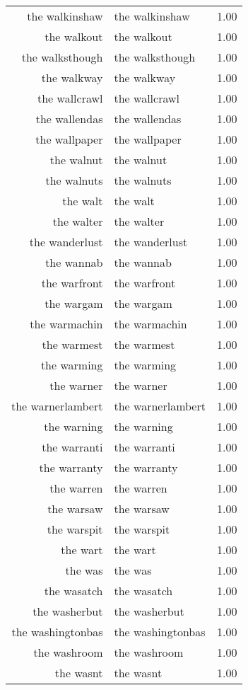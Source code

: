 \begin{table}[ht]
\begin{tabular}{rlr}
  the walkinshaw & the walkinshaw & 1.00 \\ 
  the walkout & the walkout & 1.00 \\ 
  the walksthough & the walksthough & 1.00 \\ 
  the walkway & the walkway & 1.00 \\ 
  the wallcrawl & the wallcrawl & 1.00 \\ 
  the wallendas & the wallendas & 1.00 \\ 
  the wallpaper & the wallpaper & 1.00 \\ 
  the walnut & the walnut & 1.00 \\ 
  the walnuts & the walnuts & 1.00 \\ 
  the walt & the walt & 1.00 \\ 
  the walter & the walter & 1.00 \\ 
  the wanderlust & the wanderlust & 1.00 \\ 
  the wannab & the wannab & 1.00 \\ 
  the warfront & the warfront & 1.00 \\ 
  the wargam & the wargam & 1.00 \\ 
  the warmachin & the warmachin & 1.00 \\ 
  the warmest & the warmest & 1.00 \\ 
  the warming & the warming & 1.00 \\ 
  the warner & the warner & 1.00 \\ 
  the warnerlambert & the warnerlambert & 1.00 \\ 
  the warning & the warning & 1.00 \\ 
  the warranti & the warranti & 1.00 \\ 
  the warranty & the warranty & 1.00 \\ 
  the warren & the warren & 1.00 \\ 
  the warsaw & the warsaw & 1.00 \\ 
  the warspit & the warspit & 1.00 \\ 
  the wart & the wart & 1.00 \\ 
  the was & the was & 1.00 \\ 
  the wasatch & the wasatch & 1.00 \\ 
  the washerbut & the washerbut & 1.00 \\ 
  the washingtonbas & the washingtonbas & 1.00 \\ 
  the washroom & the washroom & 1.00 \\ 
  the wasnt & the wasnt & 1.00 \\ 

\end{tabular}
\end{table}
